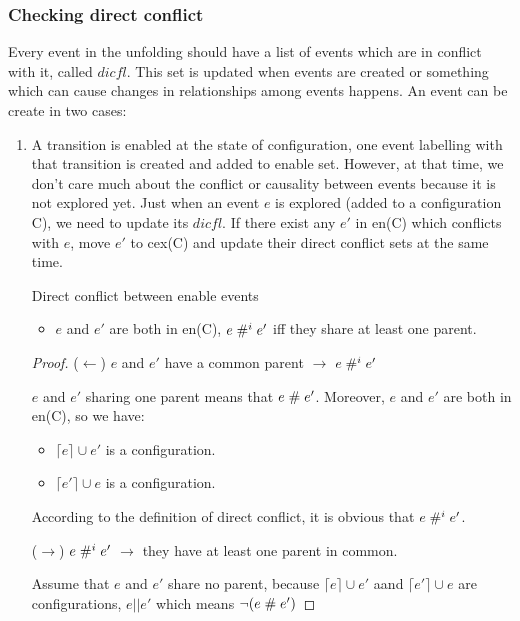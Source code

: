 \documentclass{llncs}
\begin{document}
\subsubsection{Checking direct conflict}
Every event in the unfolding should have a list of events which are in conflict with it, called $dicfl$. This set is updated when events are created or something which can cause changes in relationships among events happens.
An event can be create in two cases:
\begin{enumerate}
	\item
		A transition is enabled at the state of configuration, one event labelling with that transition is
		created and added to enable set. However, at that time, we don't care much about the conflict or
		causality between events because it is not explored yet. Just when an event $e$ is explored (added
		to a configuration C), we need to update its $dicfl$. If there exist any $e'$ in en(C) which
		conflicts with $e$, move $e'$ to cex(C) and update their direct conflict sets at the same time. 		
		
		\begin{lemma}{Direct conflict between enable events}
			\begin{itemize}
				\item
					$e$ and $e'$ are both in en(C), $e \mathrel{\#^i_{}} e'$ iff they share at least one parent.		
			\end{itemize}
		\label{thm:lem1}
		\end{lemma}
		
		\begin{proof}
			($\leftarrow$) $e$ and $e'$ have a common parent $\rightarrow$ $e \mathrel{\#^i_{}} e'$
			
			 $e$ and $e'$ sharing one parent means that  $e \mathrel{\#} e'$. Moreover, $e$ and $e'$ are both in
			  en(C), so we have:
			\begin{itemize}
				\item
					$\lceil e \rceil \cup e'$ is a configuration.
				\item
					$\lceil e' \rceil \cup e$ is a configuration.
			\end{itemize} 
			According to the definition of direct conflict, it is obvious that $e \mathrel{\#^i_{}} e'$.
			
			($\rightarrow$) $e \mathrel{\#^i_{}} e'$ $\rightarrow$ they have at least one parent in common.
			
			Assume that $e$ and $e'$ share no parent, because $\lceil e \rceil \cup e'$ aand $\lceil
			e' \rceil \cup e$ are configurations, $e || e'$ which means $\lnot (e \mathrel{\#} e')$
			

\end{proof}
\end{enumerate}
\end{document}
